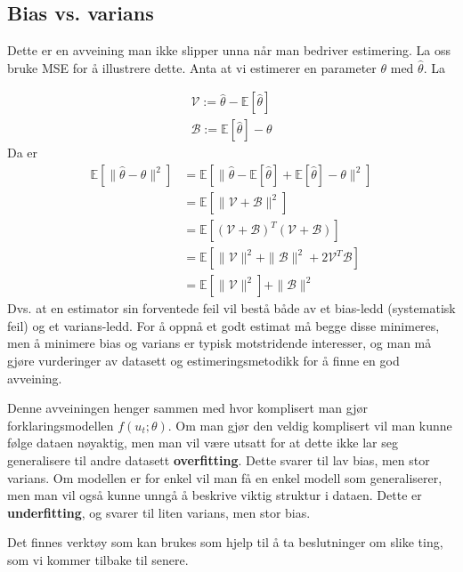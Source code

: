 \subsection{Bias vs. varians}
Dette er en avveining man ikke slipper unna når man bedriver estimering. La oss bruke MSE for å illustrere dette. Anta at vi estimerer en parameter $\theta$ med $\hat{\theta}$. La 

\begin{equation}
\begin{array}{l}{\mathcal{V}:=\widehat{\theta}-\mathbb{E}[\widehat{\theta}]} \\ {\mathcal{B}:=\mathbb{E}[\widehat{\theta}]-\theta}\end{array}
\end{equation}
Da er
\begin{align}
\mathbb{E}\left[\|\hat{\theta}-\theta\|^{2}\right] &=\mathbb{E}\left[\|\widehat{\theta}-\mathbb{E}[\widehat{\theta}]+\mathbb{E}[\widehat{\theta}]-\theta\|^{2}\right] \\ \nonumber
&=\mathbb{E}\left[\|\mathcal{V}+\mathcal{B}\|^{2}\right]\\ \nonumber
&=\mathbb{E}\left[(\mathcal{V}+\mathcal{B})^{T}(\mathcal{V}+\mathcal{B})\right] \\ \nonumber
&=\mathbb{E}\left[\|\mathcal{V}\|^{2}+\|\mathcal{B}\|^{2}+2 \mathcal{V}^{T} \mathcal{B}\right] \\ \nonumber
&=\mathbb{E}\left[\|\mathcal{V}\|^{2}\right]+\|\mathcal{B}\|^{2}
\end{align}
Dvs. at en estimator sin forventede feil vil bestå både av et bias-ledd (systematisk feil) og et varians-ledd. For å oppnå et godt estimat må begge disse minimeres, men å minimere bias og varians er typisk motstridende interesser, og man må gjøre vurderinger av datasett og estimeringsmetodikk for å finne en god avveining.

Denne avveiningen henger sammen med hvor komplisert man gjør forklaringsmodellen $f(u_t; \theta)$. Om man gjør den veldig komplisert vil man kunne følge dataen nøyaktig, men man vil være utsatt for at dette ikke lar seg generalisere til andre datasett \textbf{overfitting}. Dette svarer til lav bias, men stor varians. Om modellen er for enkel vil man få en enkel modell som generaliserer, men man vil også kunne unngå å beskrive viktig struktur i dataen. Dette er \textbf{underfitting}, og svarer til liten varians, men stor bias.

Det finnes verktøy som kan brukes som hjelp til å ta beslutninger om slike ting, som vi kommer tilbake til senere.
